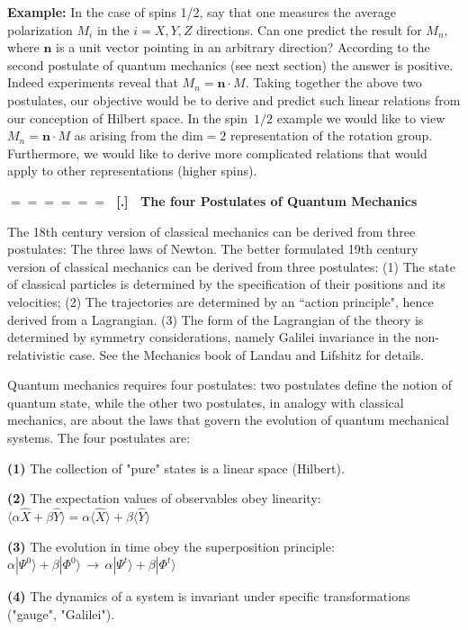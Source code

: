 \documentclass[onecolumn,fleqn]{revtex4}
\renewcommand{\thesubsection}{\arabic{subsection}}
\renewcommand{\thesubsubsection}{\arabic{subsubsection}}
\newcommand{\sheadC}[1]
{
\addtocounter{subsubsection}{1}
\vspace{5mm}
{\Large\bf $=\!=\!=\!=\!=\!=\;$ [\thesubsection.\thesubsubsection] \ #1}  
\nopagebreak
\phantomsection
}
\begin{document}
{\bf Example:} In the case of spins 1/2,  say that one measures 
the average polarization $M_i$ in the $i=X,Y,Z$ directions.  
Can one predict the result for $M_n$, where $\bm{n}$ is 
a unit vector pointing in an arbitrary direction?    
According to the second postulate of quantum mechanics (see next section) 
the answer is positive. Indeed experiments reveal that $M_n = \bm{n} \cdot M$.
Taking together the above two postulates, our objective would be 
to derive and predict such linear relations from 
our conception of Hilbert space. In the spin~$1/2$ example 
we would like to view $M_n = \bm{n} \cdot M$ as arising from 
the $\mbox{dim}{=}2$ representation of the rotation group. 
Furthermore, we would like to derive more complicated relations that 
would apply to other representations (higher spins).



\sheadC{The four Postulates of Quantum Mechanics}

The 18th century version of classical mechanics can be derived 
from three postulates: The three laws of Newton.
The better formulated 19th century version 
of classical mechanics can be derived from three postulates: 
(1) The state of classical particles is determined 
by the specification of their positions and its velocities; 
(2) The trajectories are determined by an ``action principle", 
hence derived from a Lagrangian. 
(3) The form of the Lagrangian of the theory is determined by symmetry considerations,  
namely Galilei invariance in the non-relativistic case.
See the Mechanics book of Landau and Lifshitz for details. 


Quantum mechanics requires four postulates: 
two postulates define the notion of quantum state, 
while the other two postulates, in analogy with 
classical mechanics, are about the laws that 
govern the evolution of quantum mechanical systems.
The four postulates are: 

{\bf (1)} 
The collection of "pure" states is a linear space (Hilbert).

{\bf (2)} 
The expectation values of observables obey linearity:   
${\langle \alpha \hat{X} + \beta \hat{Y} \rangle = \alpha \langle \hat{X}\rangle + \beta \langle \hat{Y} \rangle}$ 

{\bf (3)} 
The evolution in time obey the superposition principle:
${\alpha | \Psi^0 \rangle + \beta | \Phi^0 \rangle 
\, \rightarrow\, \alpha | \Psi^t \rangle + \beta | \Phi^t \rangle}$

{\bf (4)} 
The dynamics of a system is invariant 
under specific transformations ("gauge", "Galilei"). \\
\end{document}
